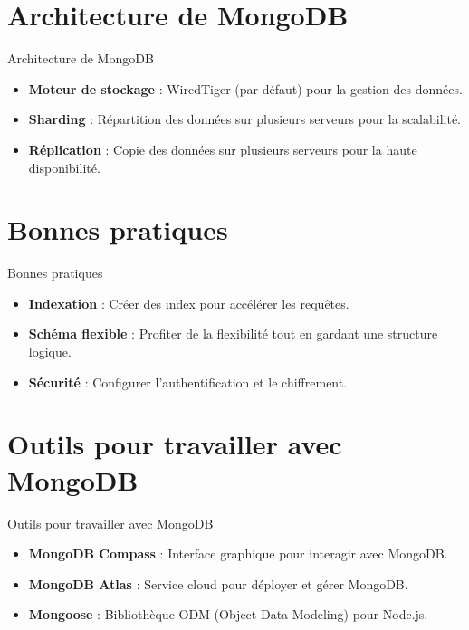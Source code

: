 \documentclass{clbeamer2024}
\begin{document}
	
	\section{Architecture de MongoDB}
	\begin{frame}{Architecture de MongoDB}
		\begin{itemize}
			\item \textbf{Moteur de stockage} : WiredTiger (par défaut) pour la gestion des données.
			\item \textbf{Sharding} : Répartition des données sur plusieurs serveurs pour la scalabilité.
			\item \textbf{Réplication} : Copie des données sur plusieurs serveurs pour la haute disponibilité.
		\end{itemize}
	\end{frame}
	
	
\section{Bonnes pratiques}
\begin{frame}{Bonnes pratiques}
	\begin{itemize}
		\item \textbf{Indexation} : Créer des index pour accélérer les requêtes.
		\item \textbf{Schéma flexible} : Profiter de la flexibilité tout en gardant une structure logique.
		\item \textbf{Sécurité} : Configurer l'authentification et le chiffrement.
	\end{itemize}
\end{frame}
	
	
	\section{Outils pour travailler avec MongoDB}
	\begin{frame}{Outils pour travailler avec MongoDB}
		\begin{itemize}
			\item \textbf{MongoDB Compass} : Interface graphique pour interagir avec MongoDB.
			\item \textbf{MongoDB Atlas} : Service cloud pour déployer et gérer MongoDB.
			\item \textbf{Mongoose} : Bibliothèque ODM (Object Data Modeling) pour Node.js.
		\end{itemize}
	\end{frame}
	
\end{document}
